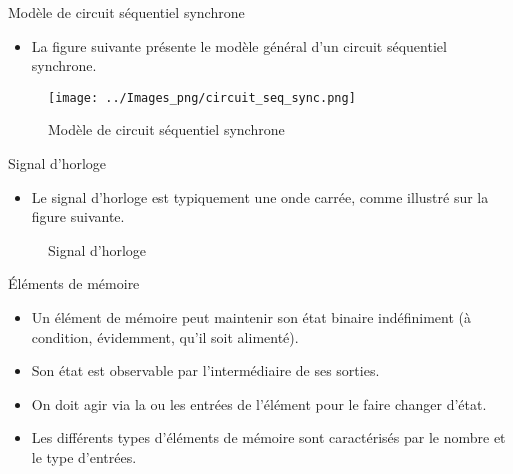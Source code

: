 \documentclass[presentation]{beamer}
\begin{document}
\begin{frame}[label={sec:org8757d74}]{Modèle de circuit séquentiel synchrone}
\begin{itemize}
\item La figure suivante présente le modèle général d'un circuit séquentiel synchrone.
\end{itemize}

\begin{figure}[htbp]
\centering
\texttt{[image: ../Images\_png/circuit\_seq\_sync.png]}
\caption{\label{fig:org8138575}Modèle de circuit séquentiel synchrone}
\end{figure}
\end{frame}

\begin{frame}[label={sec:org4cc3f68}]{Signal d'horloge}
\begin{itemize}
\item Le signal d'horloge est typiquement une onde carrée, comme illustré sur la figure suivante.
\end{itemize}

\begin{figure}[htbp]
\centering

\caption{\label{fig:org9e607d6}Signal d'horloge}
\end{figure}
\end{frame}

\begin{frame}[label={sec:org6d86eee}]{Éléments de mémoire}
\begin{itemize}
\item Un élément de mémoire peut maintenir son état binaire indéfiniment (à condition, évidemment, qu'il soit alimenté).

\item Son état est observable par l'intermédiaire de ses sorties.

\item On doit agir via la ou les entrées de l'élément pour le faire changer d'état.

\item Les différents types d'éléments de mémoire sont caractérisés par le nombre et le type d'entrées.
\end{itemize}
\end{frame}
\end{document}
